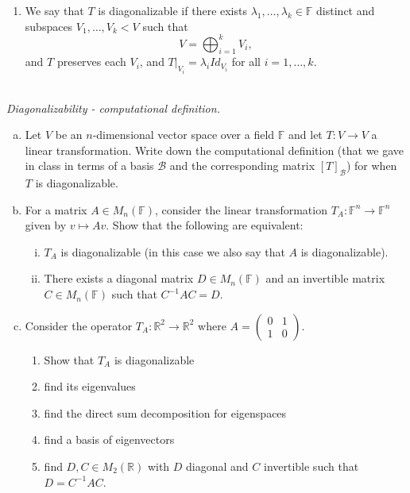 \documentclass{article}
\begin{document}
\begin{enumerate}
    \item We say that $T$ is diagonalizable if there exists $\lambda_1, \ldots, \lambda_k \in \mathbb{F}$ distinct and subspaces $V_1, \ldots, V_k < V$ such that
    \[
    V = \bigoplus_{i=1}^k V_i,
    \]
    and $T$ preserves each $V_i$, and $T|_{V_i} = \lambda_i Id_{V_i}$ for all $i = 1, \ldots, k$.
\end{enumerate}


\begin{problem} \\
    \textit{Diagonalizability - computational definition.} \\
    \begin{enumerate}[(a)]
        \item Let $V$ be an $n$-dimensional vector space over a field $\mathbb{F}$ and let $T: V \to V$ a linear transformation. Write down the computational definition (that we gave in class in terms of a basis $\mathscr{B}$ and the corresponding matrix $[T]_{\mathscr{B}}$) for when $T$ is diagonalizable.
        \item For a matrix $A \in M_n(\mathbb{F})$, consider the linear transformation $T_A: \mathbb{F}^n \to \mathbb{F}^n$ given by $v \mapsto Av$. Show that the following are equivalent:
        \begin{enumerate}[(i)]
            \item $T_A$ is diagonalizable (in this case we also say that $A$ is diagonalizable).
            \item There exists a diagonal matrix $D \in M_n(\mathbb{F})$ and an invertible matrix $C \in M_n(\mathbb{F})$ such that $C^{-1} A C = D$.
        \end{enumerate}
        \item Consider the operator $T_A: \mathbb{R}^2 \to \mathbb{R}^2$ where $A = \begin{pmatrix}
            0 & 1 \\
            1 & 0
        \end{pmatrix}$. 
        \begin{enumerate}
            \item Show that $T_A$ is diagonalizable
            \item find its eigenvalues
            \item find the direct sum decomposition for eigenspaces
            \item find a basis of eigenvectors
            \item find $D,C \in M_2(\mathbb{R})$ with $D$ diagonal and $C$ invertible such that $D = C^{-1} A C$.
        \end{enumerate}
    \end{enumerate}
\end{problem}
\end{document}
